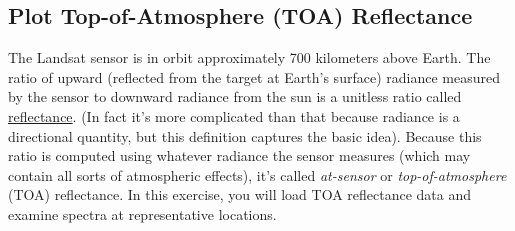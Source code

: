 \documentclass[
]{article}
\begin{document}
\hypertarget{plot-top-of-atmosphere-toa-reflectance}{%
\subsection{Plot Top-of-Atmosphere (TOA) Reflectance}\label{plot-top-of-atmosphere-toa-reflectance}}

The Landsat sensor is in orbit approximately 700 kilometers above Earth. The ratio of upward (reflected from the target at Earth's surface) radiance measured by the sensor to downward radiance from the sun is a unitless ratio called \href{https://en.wikipedia.org/wiki/Reflectance}{reflectance}. (In fact it's more complicated than that because radiance is a directional quantity, but this definition captures the basic idea). Because this ratio is computed using whatever radiance the sensor measures (which may contain all sorts of atmospheric effects), it's called \emph{at-sensor} or \emph{top-of-atmosphere} (TOA) reflectance. In this exercise, you will load TOA reflectance data and examine spectra at representative locations.
\end{document}
